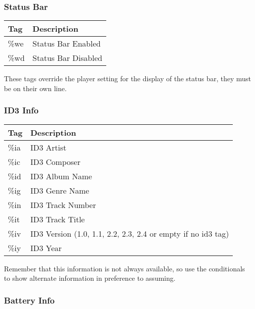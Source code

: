 \subsubsection{Status Bar}
\begin{tabular}{@{}ll@{}}\toprule
\textbf{Tag} & \textbf{Description}\\\midrule
\%we & Status Bar Enabled\\
\%wd & Status Bar Disabled\\\bottomrule
\end{tabular}
\newline
\newline
These tags override the player setting for the display of the status bar, they must be on their own line.

\subsubsection{ID3 Info}

  \begin{tabular}{@{}ll@{}}\toprule
    \textbf{Tag} & \textbf{Description}\\\midrule
    \%ia & ID3 Artist\\
    \%ic & ID3 Composer\\
    \%id & ID3 Album Name\\
    \%ig & ID3 Genre Name\\
    \%in & ID3 Track Number\\
    \%it & ID3 Track Title\\
    \%iv & ID3 Version (1.0, 1.1, 2.2, 2.3, 2.4 or empty if no id3 tag)\\
    \%iy & ID3 Year\\\bottomrule
  \end{tabular}
\newline
\newline
Remember that this information is not always available, so use the conditionals to show alternate information in preference to assuming.

\subsubsection{Battery Info}

